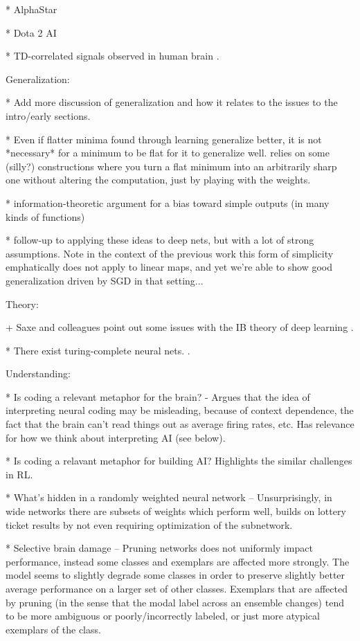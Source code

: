 * AlphaStar \citep{Vinyals2019}

* Dota 2 AI \citep{OpenAI2019}

* TD-correlated signals observed in human brain \citep{ODoherty2003}.


Generalization:

* Add more discussion of generalization and how it relates to the issues to the intro/early sections.

* Even if flatter minima found through learning generalize better, it is not *necessary* for a minimum to be flat for it to generalize well. relies on some (silly?) constructions where you turn a flat minimum into an arbitrarily sharp one without altering the computation, just by playing with the weights. \citep{Dinh2017} 

* information-theoretic argument for a bias toward simple outputs (in many kinds of functions) \citep{Dingle2018}

* follow-up to \citep{Dingle2018} applying these ideas to deep nets, but with a lot of strong assumptions. \citep{Perez2019} Note in the context of the previous work this form of simplicity emphatically does not apply to linear maps, and yet we're able to show good generalization driven by SGD in that setting...  


Theory:

+ Saxe and colleagues point out some issues with the IB theory of deep learning \citep{Saxe2018a}.

* There exist turing-complete neural nets. \citep{Siegelman1992}.


Understanding:

* Is coding a relevant metaphor for the brain? - Argues that the idea of interpreting neural coding may be misleading, because of context dependence, the fact that the brain can't read things out as average firing rates, etc. Has relevance for how we think about interpreting AI (see below). \citep{Brette2019} 

* Is coding a relavant metaphor for building AI? Highlights the similar challenges in RL. \citep{Santoro2019}

* What's hidden in a randomly weighted neural network -- Unsurprisingly, in wide networks there are subsets of weights which perform well, builds on lottery ticket results by not even requiring optimization of the subnetwork. \citep{Ramanujan2019}

* Selective brain damage -- Pruning networks does not uniformly impact performance, instead some classes and exemplars are affected more strongly. The model seems to slightly degrade some classes in order to preserve slightly better average performance on a larger set of other classes. Exemplars that are affected by pruning (in the sense that the modal label across an ensemble changes) tend to be more ambiguous or poorly/incorrectly labeled, or just more atypical exemplars of the class. \citep{Hooker2019}


